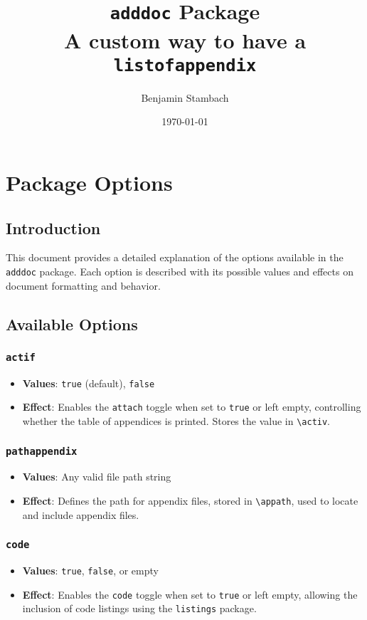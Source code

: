 \documentclass[12pt,twoside]{report}
\title{\texttt{adddoc} Package \\ A custom way to have a \texttt{listofappendix}}
\author{Benjamin Stambach}
\date{\today}
\begin{document}
\maketitle

\startbody

\chapter{Package Options}
\section*{Introduction}
This document provides a detailed explanation of the options available in the \texttt{adddoc} package. Each option is described with its possible values and effects on document formatting and behavior.

\section{Available Options}

\subsection{\texttt{actif}}
\begin{itemize}
    \item \textbf{Values}: \texttt{true} (default), \texttt{false}
    \item \textbf{Effect}: Enables the \texttt{attach} toggle when set to \texttt{true} or left empty, controlling whether the table of appendices is printed. Stores the value in \texttt{\textbackslash activ}.
\end{itemize}

\subsection{\texttt{pathappendix}}
\begin{itemize}
    \item \textbf{Values}: Any valid file path string
    \item \textbf{Effect}: Defines the path for appendix files, stored in \texttt{\textbackslash appath}, used to locate and include appendix files.
\end{itemize}

\subsection{\texttt{code}}
\begin{itemize}
    \item \textbf{Values}: \texttt{true}, \texttt{false}, or empty
    \item \textbf{Effect}: Enables the \texttt{code} toggle when set to \texttt{true} or left empty, allowing the inclusion of code listings using the \texttt{listings} package.
\end{itemize}
\end{document}
